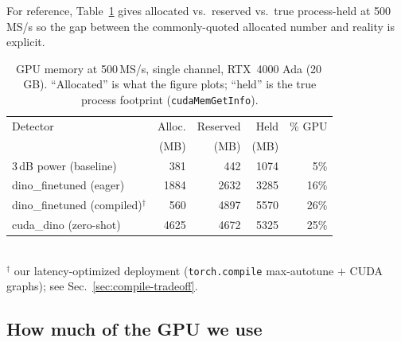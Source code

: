 For reference, Table~\ref{tab:mem} gives allocated vs.\ reserved vs.\ true process-held at
500\,MS/s so the gap between the commonly-quoted allocated number and reality is explicit.

\begin{table}[t]
  \centering
  \caption{GPU memory at 500\,MS/s, single channel, RTX~4000 Ada (20\,GB). ``Allocated'' is what
    the figure plots; ``held'' is the true process footprint (\texttt{cudaMemGetInfo}).}
  \label{tab:mem}
  \begin{tabular}{lrrrr}
    \hline
    Detector & Alloc. & Reserved & Held & \% GPU \\
             & (MB)   & (MB)     & (MB) &        \\
    \hline
    3\,dB power (baseline)               &  381 &  442 & 1074 &  5\% \\
    dino\_finetuned (eager)              & 1884 & 2632 & 3285 & 16\% \\
    dino\_finetuned (compiled)$^\dagger$ &  560 & 4897 & 5570 & 26\% \\
    cuda\_dino (zero-shot)               & 4625 & 4672 & 5325 & 25\% \\
    \hline
  \end{tabular}
  \\[2pt]
  {\footnotesize $^\dagger$ our latency-optimized deployment (\texttt{torch.compile} max-autotune
   $+$ CUDA graphs); see Sec.~\ref{sec:compile-tradeoff}.}
\end{table}

\subsection{How much of the GPU we use}
\label{sec:percent}
